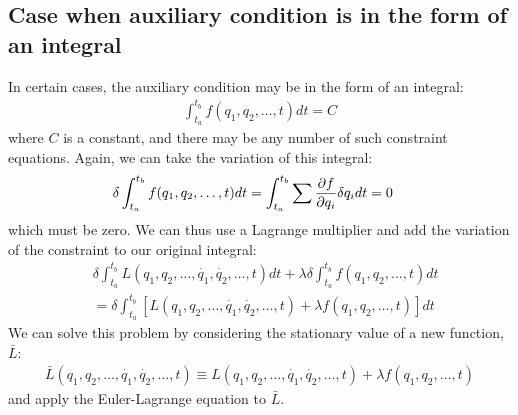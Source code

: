 \subsection{Case when auxiliary condition is in the form of an integral}
In certain cases, the auxiliary condition may be in the form of an integral:
\begin{align}
\int_{t_a}^{t_b} f(q_1,q_2,\dots,t)dt=C
\end{align}
where $C$ is a constant, and there may be any number of such constraint equations. Again, we can take the variation of this integral:
\begin{align}
\delta\int_{t_a}^{t_b} f(q_1,q_2,\dots,t)dt&=\int_{t_a}^{t_b} \sum \frac{\partial f}{\partial q_i}\delta q_i dt=0
\end{align}
which must be zero. We can thus use a Lagrange multiplier and add the variation of the constraint to our original integral:
\begin{align}
&\delta\int_{t_a}^{t_b}  L(q_1,q_2,\dots,\dot{q_1}, \dot{q_2},\dots,t)dt+\lambda\delta\int_{t_a}^{t_b} f(q_1,q_2,\dots,t)dt\nonumber\\&=\delta \int_{t_a}^{t_b}\left[L(q_1,q_2,\dots,\dot{q_1}, \dot{q_2},\dots,t)+\lambda f(q_1,q_2,\dots,t)\right] dt
\end{align}
We can solve this problem by considering the stationary value of a new function, $\bar L$:
\begin{align}
\bar L(q_1,q_2,\dots,\dot{q_1}, \dot{q_2},\dots,t)\equiv L(q_1,q_2,\dots,\dot{q_1}, \dot{q_2},\dots,t)+\lambda f(q_1,q_2,\dots,t)
\end{align}
and apply the Euler-Lagrange equation to $\bar L$.

